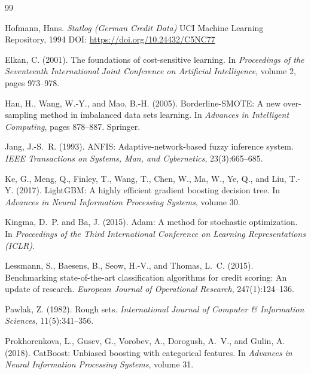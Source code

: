 \documentclass[12pt,a4paper]{article}
\begin{document}
\begin{thebibliography}{99}

Hofmann, Hans. \textit{Statlog (German Credit Data)}
\newblock UCI Machine Learning Repository, 1994
\newblock DOI: \url{https://doi.org/10.24432/C5NC77}

Elkan, C. (2001).
\newblock The foundations of cost-sensitive learning.
\newblock In \textit{Proceedings of the Seventeenth International Joint Conference on Artificial Intelligence}, volume 2, pages 973--978.

Han, H., Wang, W.-Y., and Mao, B.-H. (2005).
\newblock Borderline-SMOTE: A new over-sampling method in imbalanced data sets learning.
\newblock In \textit{Advances in Intelligent Computing}, pages 878--887. Springer.

Jang, J.-S.~R. (1993).
\newblock ANFIS: Adaptive-network-based fuzzy inference system.
\newblock \textit{IEEE Transactions on Systems, Man, and Cybernetics}, 23(3):665--685.

Ke, G., Meng, Q., Finley, T., Wang, T., Chen, W., Ma, W., Ye, Q., and Liu, T.-Y. (2017).
\newblock LightGBM: A highly efficient gradient boosting decision tree.
\newblock In \textit{Advances in Neural Information Processing Systems}, volume 30.

Kingma, D.~P. and Ba, J. (2015).
\newblock Adam: A method for stochastic optimization.
\newblock In \textit{Proceedings of the Third International Conference on Learning Representations (ICLR)}.

Lessmann, S., Baesens, B., Seow, H.-V., and Thomas, L.~C. (2015).
\newblock Benchmarking state-of-the-art classification algorithms for credit scoring: An update of research.
\newblock \textit{European Journal of Operational Research}, 247(1):124--136.

Pawlak, Z. (1982).
\newblock Rough sets.
\newblock \textit{International Journal of Computer \& Information Sciences}, 11(5):341--356.

Prokhorenkova, L., Gusev, G., Vorobev, A., Dorogush, A.~V., and Gulin, A. (2018).
\newblock CatBoost: Unbiased boosting with categorical features.
\newblock In \textit{Advances in Neural Information Processing Systems}, volume 31.


\end{thebibliography}
\end{document}
